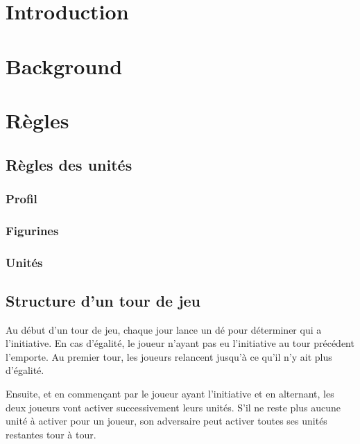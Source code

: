 \documentclass[10pt,a4paper]{book}
\author{ Antoine Robin}
\title{\nom}
\begin{document}
\maketitle
\tableofcontents
\chapter*{Introduction}
\chapter{Background}

\chapter{Règles}
\section{Règles des unités}
\subsection{Profil}
\subsection{Figurines}
\subsection{Unités}
\section{Structure d'un tour de jeu}
Au début d'un tour de jeu, chaque jour lance un dé pour déterminer qui a l'initiative. En cas d'égalité, le joueur n'ayant pas eu l'initiative au tour précédent l'emporte. Au premier tour, les joueurs relancent jusqu'à ce qu'il n'y ait plus d'égalité.

Ensuite, et en commençant par le joueur ayant l'initiative et en alternant, les deux joueurs vont activer successivement leurs unités. S'il ne reste plus aucune unité à activer pour un joueur, son adversaire peut activer toutes ses unités restantes tour à tour.
\end{document}
